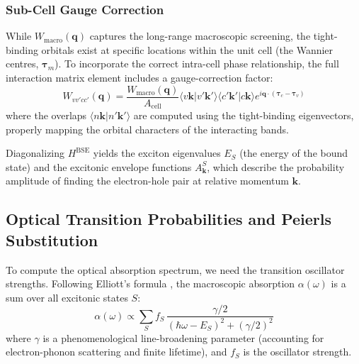 \documentclass[11pt, a4paper]{article}
\begin{document}
\subsubsection{Sub-Cell Gauge Correction}
While $W_{\text{macro}}(\mathbf{q})$ captures the long-range macroscopic screening, the tight-binding orbitals exist at specific locations within the unit cell (the Wannier centres, $\boldsymbol{\tau}_m$). To incorporate the correct intra-cell phase relationship, the full interaction matrix element includes a gauge-correction factor:
\begin{equation}
    W_{vv'cc'}(\mathbf{q}) = \frac{W_{\text{macro}}(\mathbf{q})}{A_{\text{cell}}} \langle v\mathbf{k} | v'\mathbf{k}' \rangle \langle c'\mathbf{k}' | c\mathbf{k} \rangle e^{i \mathbf{q} \cdot (\boldsymbol{\tau}_c - \boldsymbol{\tau}_v)}
\end{equation}
where the overlaps $\langle n\mathbf{k} | n'\mathbf{k}' \rangle$ are computed using the tight-binding eigenvectors, properly mapping the orbital characters of the interacting bands.

Diagonalizing $H^{\text{BSE}}$ yields the exciton eigenvalues $E_S$ (the energy of the bound state) and the excitonic envelope functions $A_{\mathbf{k}}^S$, which describe the probability amplitude of finding the electron-hole pair at relative momentum $\mathbf{k}$.

\subsection{Optical Transition Probabilities and Peierls Substitution}
To compute the optical absorption spectrum, we need the transition oscillator strengths. Following Elliott's formula \cite{haug_koch_2009}, the macroscopic absorption $\alpha(\omega)$ is a sum over all excitonic states $S$:
\begin{equation}
    \alpha(\omega) \propto \sum_S f_S \, \frac{\gamma / 2}{(\hbar\omega - E_S)^2 + (\gamma/2)^2}
\end{equation}
where $\gamma$ is a phenomenological line-broadening parameter (accounting for electron-phonon scattering and finite lifetime), and $f_S$ is the oscillator strength. 
\end{document}

